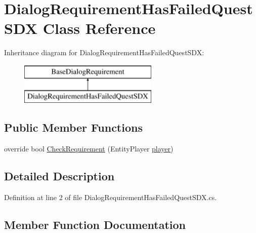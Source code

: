 \hypertarget{class_dialog_requirement_has_failed_quest_s_d_x}{}\section{Dialog\+Requirement\+Has\+Failed\+Quest\+S\+DX Class Reference}
\label{class_dialog_requirement_has_failed_quest_s_d_x}
Inheritance diagram for Dialog\+Requirement\+Has\+Failed\+Quest\+S\+DX\+:\begin{figure}[H]
\begin{center}
\leavevmode
\includegraphics[height=2.000000cm]{d2/dc1/class_dialog_requirement_has_failed_quest_s_d_x}
\end{center}
\end{figure}
\subsection*{Public Member Functions}
\begin{DoxyCompactItemize}
\item 
override bool \mbox{\hyperlink{class_dialog_requirement_has_failed_quest_s_d_x_ac660b6533d785fad7192c3d412b4feb2}{Check\+Requirement}} (Entity\+Player \mbox{\hyperlink{_sphere_i_i_01_music_01_boxes_2_config_2_localization_8txt_a4e2cb8aeff651600ea1cc57fe5a929a4}{player}})
\end{DoxyCompactItemize}


\subsection{Detailed Description}


Definition at line 2 of file Dialog\+Requirement\+Has\+Failed\+Quest\+S\+D\+X.\+cs.



\subsection{Member Function Documentation}
\mbox{\label{class_dialog_requirement_has_failed_quest_s_d_x_ac660b6533d785fad7192c3d412b4feb2}} 
